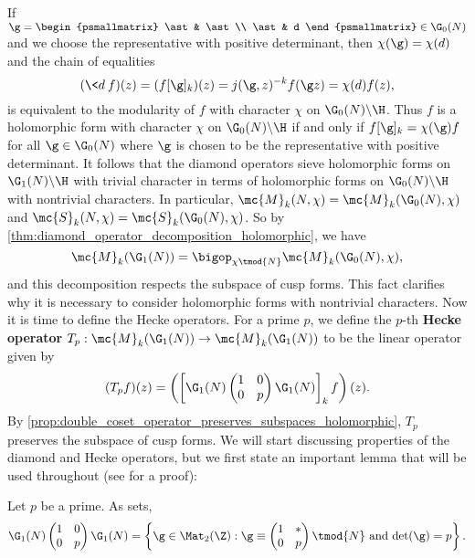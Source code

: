     If $\g = \begin{psmallmatrix} \ast & \ast \\ \ast & d \end{psmallmatrix} \in \G_{0}(N)$ and we choose the representative with positive determinant, then $\chi(\g) = \chi(d)$ and the chain of equalities
    \[
      (\<d\>f)(z) = (f[\g]_{k})(z) = j(\g,z)^{-k}f(\g z) = \chi(d)f(z),
    \]
    is equivalent to the modularity of $f$ with character $\chi$ on $\G_{0}(N)\backslash\H$. Thus $f$ is a holomorphic form with character $\chi$ on $\G_{0}(N)\backslash\H$ if and only if $f[\g]_{k} = \chi(\g)f$ for all $\g \in \G_{0}(N)$ where $\g$ is chosen to be the representative with positive determinant. It follows that the diamond operators sieve holomorphic forms on $\G_{1}(N)\backslash\H$ with trivial character in terms of holomorphic forms on $\G_{0}(N)\backslash\H$ with nontrivial characters. In particular, $\mc{M}_{k}(N,\chi) = \mc{M}_{k}(\G_{0}(N),\chi)$ and $\mc{S}_{k}(N,\chi) = \mc{S}_{k}(\G_{0}(N),\chi)$. So by \cref{thm:diamond_operator_decomposition_holomorphic}, we have
    \[
      \mc{M}_{k}(\G_{1}(N)) = \bigop_{\chi \tmod{N}}\mc{M}_{k}(\G_{0}(N),\chi),
    \]
    and this decomposition respects the subspace of cusp forms. This fact clarifies why it is necessary to consider holomorphic forms with nontrivial characters. Now it is time to define the Hecke operators. For a prime $p$, we define the $p$-th \textbf{Hecke operator} $T_{p}:\mc{M}_{k}(\G_{1}(N)) \to \mc{M}_{k}(\G_{1}(N))$ to be the linear operator given by
    \[
      (T_{p}f)(z) = \left(\left[\G_{1}(N)\begin{pmatrix} 1 & 0 \\ 0 & p \end{pmatrix}\G_{1}(N)\right]_{k}f\right)(z).
    \]
    By \cref{prop:double_coset_operator_preserves_subspaces_holomorphic}, $T_{p}$ preserves the subspace of cusp forms. We will start discussing properties of the diamond and Hecke operators, but we first state an important lemma that will be used throughout (see \cite{diamond2005first} for a proof):

    \begin{lemma}\label{lem:cosets_for_Hecke_operators}
      Let $p$ be a prime. As sets,
      \[
        \G_{1}(N)\begin{pmatrix} 1 & 0 \\ 0 & p \end{pmatrix}\G_{1}(N) = \left\{\g \in \Mat_{2}(\Z):\text{$\g \equiv \begin{pmatrix} 1 & \ast \\ 0 & p \end{pmatrix} \tmod{N}$ and $\det(\g) = p$}\right\}.
      \]
    \end{lemma}
    

